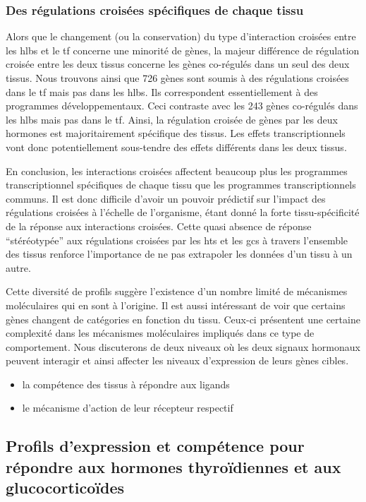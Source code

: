 \documentclass[../main.tex]{subfiles}
\begin{document}
		\subsubsection{Des régulations croisées spécifiques de chaque tissu}
			Alors que le changement (ou la conservation) du type d'interaction croisées entre les \glspl{hlb} et le \gls{tf} concerne une minorité de gènes, la majeur différence de régulation croisée entre les deux tissus concerne les gènes co-régulés dans un seul des deux tissus.
			Nous trouvons ainsi que 726 gènes sont soumis à des régulations croisées dans le \gls{tf} mais pas dans les \glspl{hlb}.
			Ils correspondent essentiellement à des programmes développementaux.
			Ceci contraste avec les 243 gènes co-régulés dans les \glspl{hlb} mais pas dans le \gls{tf}.
			Ainsi, la régulation croisée de gènes par les deux hormones est majoritairement spécifique des tissus.
			Les effets transcriptionnels vont donc potentiellement sous-tendre des effets différents dans les deux tissus.
		\\
		\par
		En conclusion, les interactions croisées affectent beaucoup plus les programmes transcriptionnel spécifiques de chaque tissu que les programmes transcriptionnels communs.
		Il est donc difficile d'avoir un pouvoir prédictif sur l'impact des régulations croisées à l'échelle de l'organisme, étant donné la forte tissu-spécificité de la réponse aux interactions croisées.
		Cette quasi absence de réponse ``stéréotypée'' aux régulations croisées par les \glspl{ht} et les \glspl{gc} à travers l'ensemble des tissus renforce l'importance de ne pas extrapoler les données d'un tissu à un autre.
		\par
		Cette diversité de profils suggère l'existence d'un nombre limité de mécanismes moléculaires qui en sont à l'origine.
		Il est aussi intéressant de voir que certains gènes changent de catégories en fonction du tissu.
		Ceux-ci présentent une certaine complexité dans les mécanismes moléculaires impliqués dans ce type de comportement.
		Nous discuterons de deux niveaux où les deux signaux hormonaux peuvent interagir et ainsi affecter les niveaux d'expression de leurs gènes cibles.
		\begin{itemize}
			\item
				la compétence des tissus à répondre aux ligands
			\item
				le mécanisme d'action de leur récepteur respectif
		\end{itemize}

	\subsection{Profils d'expression et compétence pour répondre aux hormones thyroïdiennes et aux glucocorticoïdes}
\end{document}
